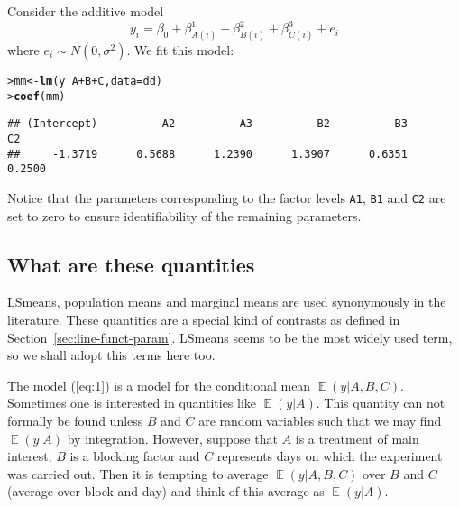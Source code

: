 \documentclass[11pt]{article}\usepackage[]{graphicx}\usepackage[]{color}
\makeatletter
\newcommand{\hlopt}[1]{\textcolor[rgb]{0,0,0}{#1}}%
\newcommand{\hlstd}[1]{\textcolor[rgb]{0.345,0.345,0.345}{#1}}%
\newcommand{\hlkwb}[1]{\textcolor[rgb]{0.69,0.353,0.396}{#1}}%
\newcommand{\hlkwc}[1]{\textcolor[rgb]{0.333,0.667,0.333}{#1}}%
\newcommand{\hlkwd}[1]{\textcolor[rgb]{0.737,0.353,0.396}{\textbf{#1}}}%
\newenvironment{kframe}{%
 \def\at@end@of@kframe{}%
 \ifinner\ifhmode%
  \def\at@end@of@kframe{\end{minipage}}%
  \begin{minipage}{\columnwidth}%
 \fi\fi%
 \def\FrameCommand##1{\hskip\@totalleftmargin \hskip-\fboxsep
 \colorbox{shadecolor}{##1}\hskip-\fboxsep
     \hskip-\linewidth \hskip-\@totalleftmargin \hskip\columnwidth}%
 \MakeFramed {\advance\hsize-\width
   \@totalleftmargin\z@ \linewidth\hsize
   \@setminipage}}%
 {\par\unskip\endMakeFramed%
 \at@end@of@kframe}
\newenvironment{knitrout}{}{} %
\def\code#1{\texttt{#1}}
\renewenvironment{knitrout}{
  \begin{oldknitrout}
    \footnotesize
    \topsep=0pt
}{
  \end{oldknitrout}
}
\DeclareMathOperator{\EE}{\mathbb{E}}
\makeatother
\begin{document}
Consider the additive model
\begin{equation}
  \label{eq:1}
  y_i = \beta_0 + \beta^1_{A(i)}+\beta^2_{B(i)} + \beta^3_{C(i)} + e_i
\end{equation}
where $e_i \sim N(0,\sigma^2)$. We fit this model:


\begin{knitrout}
\color{fgcolor}\begin{kframe}
\begin{alltt}
\hlstd{> }\hlstd{mm} \hlkwb{<-} \hlkwd{lm}\hlstd{(y}\hlopt{~}\hlstd{A}\hlopt{+}\hlstd{B}\hlopt{+}\hlstd{C,} \hlkwc{data}\hlstd{=dd)}
\hlstd{> }\hlkwd{coef}\hlstd{(mm)}
\end{alltt}
\begin{verbatim}
## (Intercept)          A2          A3          B2          B3          C2 
##     -1.3719      0.5688      1.2390      1.3907      0.6351      0.2500
\end{verbatim}
\end{kframe}
\end{knitrout}

Notice that the parameters corresponding to the factor levels
\code{A1}, \code{B1} and \code{C2} are set to zero to ensure
identifiability of the remaining parameters.

\subsection{What are these quantities}
\label{sec:what-are-these}

LSmeans, population means and marginal means are used synonymously in
the literature. 
These quantities are a special kind of contrasts as defined in
Section~\ref{sec:line-funct-param}.
LSmeans seems to be the most widely used term, so we
shall adopt this terms here too.

The model (\ref{eq:1})
is a model for the conditional mean $\EE(y|A,B,C)$.  Sometimes one is
interested in quantities like $\EE(y|A)$. This quantity can not
formally be found unless $B$ and $C$ are random variables such that we
may find $\EE(y|A)$ by integration.
However, suppose that $A$ is a treatment of main interest, $B$ is a
blocking factor and $C$ represents days on which the experiment was
carried out. Then it is tempting to average $\EE(y|A,B,C)$ over $B$
and $C$ (average over block and day) and think of this average as
$\EE(y|A)$.

\end{document}
